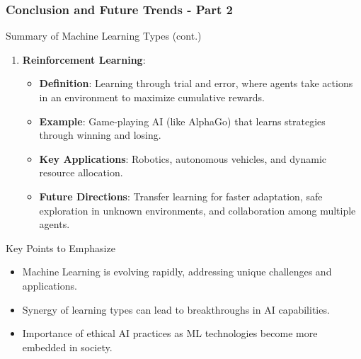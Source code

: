 \documentclass{beamer}
\begin{document}
\begin{frame}[fragile]
    \frametitle{Conclusion and Future Trends - Part 2}
    \begin{block}{Summary of Machine Learning Types (cont.)}
        \begin{enumerate}[resume]
            \item \textbf{Reinforcement Learning}:
            \begin{itemize}
                \item \textbf{Definition}: Learning through trial and error, where agents take actions in an environment to maximize cumulative rewards.
                \item \textbf{Example}: Game-playing AI (like AlphaGo) that learns strategies through winning and losing.
                \item \textbf{Key Applications}: Robotics, autonomous vehicles, and dynamic resource allocation.
                \item \textbf{Future Directions}: Transfer learning for faster adaptation, safe exploration in unknown environments, and collaboration among multiple agents.
            \end{itemize}
        \end{enumerate}

        \begin{block}{Key Points to Emphasize}
            \begin{itemize}
                \item Machine Learning is evolving rapidly, addressing unique challenges and applications.
                \item Synergy of learning types can lead to breakthroughs in AI capabilities.
                \item Importance of ethical AI practices as ML technologies become more embedded in society.
            \end{itemize}
        \end{block}
    \end{block}
\end{frame}
\end{document}
